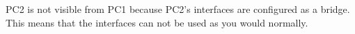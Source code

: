 

PC2 is not visible from PC1 because PC2's interfaces are configured as a bridge. This means that the interfaces can not be used as you would normally.
